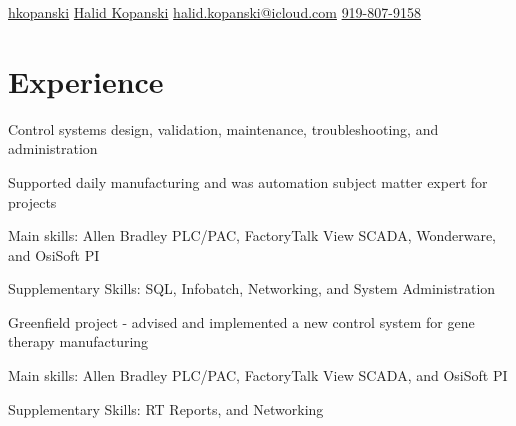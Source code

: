 \documentclass[]{plushcv}
\begin{document}
%
%

{\contactline
{\href{}{}}
{\href{https://github.com/hkopanski}{hkopanski}}
{\href{https://www.linkedin.com/in/halidkopanski/}{Halid Kopanski}}
{\href{mailto:halid.kopanski@icloud.net}{halid.kopanski@icloud.com}}
{\href{tel:919-807-9158}{919-807-9158}}
}

%
%

\begin{minipage}[t]{0.70\textwidth} 



\section{Experience}
\vspace{\topsep} %
\begin{tightemize}
\sectionsep
  \item {Control systems design, validation, maintenance, troubleshooting, and administration}
  \item {Supported daily manufacturing and was automation subject matter expert for projects}  
  \item {Main skills: Allen Bradley PLC/PAC, FactoryTalk View SCADA, Wonderware, and OsiSoft PI}
  \item {Supplementary Skills: SQL, Infobatch, Networking, and System Administration}
\end{tightemize}
\sectionsep

\begin{tightemize}
\sectionsep
    \item {Greenfield project - advised and implemented a new control system for gene therapy manufacturing}
    \item {Main skills: Allen Bradley PLC/PAC, FactoryTalk View SCADA, and OsiSoft PI}
    \item {Supplementary Skills: RT Reports, and Networking}
\end{tightemize}
\sectionsep


\end{minipage}
\end{document}
